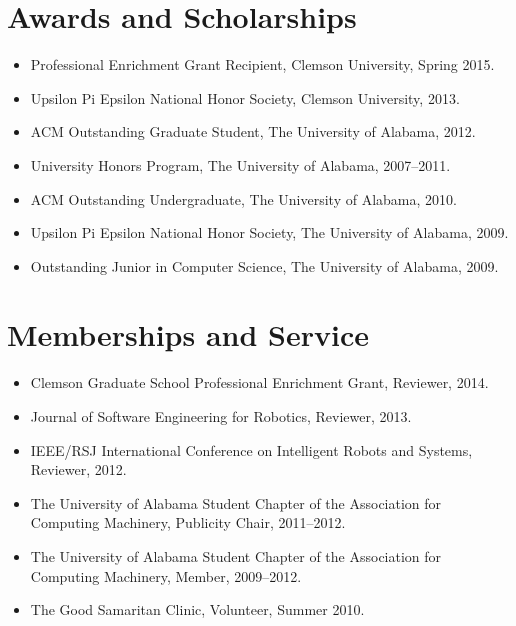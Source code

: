 \documentclass[12pt,oldfontcommands]{memoir}
\begin{document}
\nocite{*}



\section*{Awards and Scholarships}

\begin{itemize}[leftmargin=*]
  \item Professional Enrichment Grant Recipient, Clemson University, Spring
        2015.
  \item Upsilon Pi Epsilon National Honor Society, Clemson University, 2013.
  \item ACM Outstanding Graduate Student, The University of Alabama, 2012.
  \item University Honors Program, The University of Alabama, 2007--2011.
  \item ACM Outstanding Undergraduate, The University of Alabama, 2010.
  \item Upsilon Pi Epsilon National Honor Society, The University of Alabama, 2009.
  \item Outstanding Junior in Computer Science, The University of Alabama, 2009.
\end{itemize}

\section*{Memberships and Service}

\begin{itemize}[leftmargin=*]
  \item Clemson Graduate School Professional Enrichment Grant, Reviewer, 2014.
  \item Journal of Software Engineering for Robotics, Reviewer, 2013.
  \item IEEE/RSJ International Conference on Intelligent Robots and
        Systems, Reviewer, 2012.
  \item The University of Alabama Student Chapter of the Association for
        Computing Machinery, Publicity Chair, 2011--2012.
  \item The University of Alabama Student Chapter of the Association for
        Computing Machinery, Member, 2009--2012.
  \item The Good Samaritan Clinic, Volunteer, Summer 2010.
\end{itemize}
\end{document}
